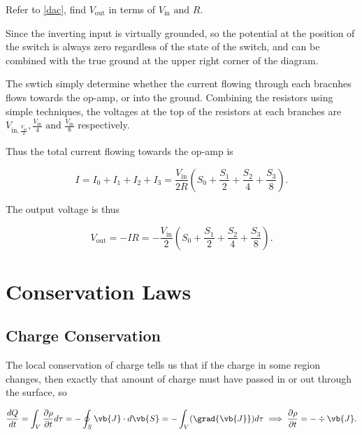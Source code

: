 \documentclass[english,a4paper,12pt]{report}
\begin{document}
{Refer to \cref{dac}, find \(V_{\text{out} } \) in terms of \(V_{\text{in} }\text { and } R \).  }
{Since the inverting input is virtually grounded, so the potential at the position of the switch is always zero regardless of the state of the switch, and can be combined with the true ground at the upper right corner of the diagram.

The swtich simply determine whether the current flowing through each bracnhes flows towards the op-amp, or into the ground. Combining the resistors using simple techniques, the voltages at the top of the resistors at each branches are \(V_{\text{in}, \frac{V_{\text{in} } }{2} }, \frac{V_{\text{in} } }{4}  \text { and } \frac{V_{\text{in} } }{8}  \) respectively. 

Thus the total current flowing towards the op-amp is

\begin{equation}
    I = I_0 + I_1 + I_2 + I_3 = \frac{V_{\text{in} } }{2R}\left( S_0 + \frac{S_1}{2} + \frac{S_2 }{4} + \frac{S_3}{8} \right). 
\end{equation}

The output voltage is thus 

\begin{equation}
    V_{\text{out} } = - IR =  - \frac{V_{\text{in} } }{2}\left( S_0 + \frac{S_1}{2} + \frac{S_2 }{4} + \frac{S_3}{8} \right).
\end{equation}


} 


\chapter{Conservation Laws}

\section{Charge Conservation}

The local conservation of charge tells us that if the charge in some region changes, then exactly that amount of charge must have passed in or out through the surface, so 

\begin{equation}
    \frac{dQ}{dt} = \int_{V}^{} \frac{\partial \rho }{\partial t} d\tau =   -\oint_{S} \vb{J} \cdot d\vb{S}  = -\int_{V}^{} (\grad{\vb{J} } ) d\tau   \implies \frac{\partial \rho }{\partial t} = - \div{\vb{J} }.   \label{contincharge} 
\end{equation}
\end{document}
